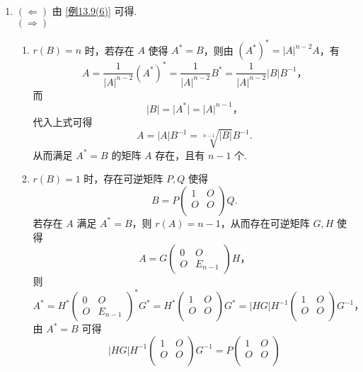 \begin{enumerate}
\begin{enumerate}
        \item $(\Leftarrow)$ 由 \ref*{例13.9(6)} 可得.\\
        $(\Rightarrow)$ \begin{enumerate}
            \item $r(B) = n$ 时，若存在 $A$ 使得 $A^* = B$，则由 $(A^*)^* = \lvert A \rvert^{n-2}A$，有 \[A = \dfrac{1}{\lvert A \rvert^{n-2}}(A^*)^* = \dfrac{1}{\lvert A \rvert^{n-2}}B^* = \dfrac{1}{\lvert A \rvert^{n-2}}\lvert B \rvert B^{-1}，\] 而 \[\lvert B \rvert = \lvert A^* \rvert = \lvert A \rvert^{n-1}，\] 代入上式可得 \[A = \lvert A \rvert B^{-1} = \sqrt[n-1]{\lvert B \rvert} B^{-1}.\] 从而满足 $A^* = B$ 的矩阵 $A$ 存在，且有 $n-1$ 个.
            \item $r(B) = 1$ 时，存在可逆矩阵 $P, Q$ 使得 \[B = P\begin{pmatrix}
                1 & O \\
                O & O \\
            \end{pmatrix}Q.\] 若存在 $A$ 满足 $A^{*} = B$，则 $r(A) = n-1$，从而存在可逆矩阵 $G, H$ 使得 \[A = G\begin{pmatrix}
                0 & O \\
                O & E_{n-1}
            \end{pmatrix}H，\] 则 \[A^* = H^*\begin{pmatrix}
                0 & O \\
                O & E_{n-1}
            \end{pmatrix}^*G^* = H^*\begin{pmatrix}
                1 & O \\
                O & O \\
            \end{pmatrix}G^* = \lvert HG \rvert H^{-1}\begin{pmatrix}
                1 & O \\
                O & O \\
            \end{pmatrix}G^{-1}，\] 由 $A^* = B$ 可得 \[\lvert HG \rvert H^{-1}\begin{pmatrix}
                1 & O \\
                O & O \\
            \end{pmatrix}G^{-1} = P\begin{pmatrix}
                1 & O \\
                O & O \\

\end{pmatrix}\]
\end{enumerate}
\end{enumerate}
\end{enumerate}
